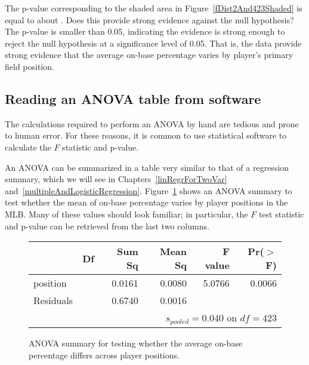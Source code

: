 \begin{examplewrap}
\begin{nexample}{The p-value corresponding to
    the shaded area in
    Figure~\ref{fDist2And423Shaded}
    is equal to about \mlbPvalue{}.
    Does this provide strong evidence against the
    null hypothesis?}
  The p-value is smaller than 0.05, indicating the evidence
  is strong enough to reject the null hypothesis
  at a significance level of 0.05.
  That is, the data provide strong evidence that the average
  on-base percentage varies by player's primary field position.
\end{nexample}
\end{examplewrap}


\subsection{Reading an ANOVA table from software}

The calculations required to perform an ANOVA by hand are
tedious and prone to human error.
For these reasons, it is common to use statistical software
to calculate the $F$ statistic and p-value.

An ANOVA can be summarized in a table very similar to that
of a regression summary, which we will see in
Chapters~\ref{linRegrForTwoVar}
and~\ref{multipleAndLogisticRegression}.
Figure~\ref{anovaSummaryTableForOBPAgainstPosition}
shows an ANOVA summary to test whether the mean of on-base
percentage varies by player positions in the MLB.
Many of these values should look familiar;
in particular, the $F$ test statistic and p-value
can be retrieved from the last two columns.

\begin{figure}[ht]
\centering
\begin{tabular}{lrrrrr}
  \hline
  & Df & Sum Sq & Mean Sq & F value & Pr($>$F) \\ 
  \hline
  position & \mlbDFA{} & 0.0161 & 0.0080 & 5.0766 & 0.0066 \\ 
  Residuals & \mlbDFB{} & 0.6740 & 0.0016 &  &  \\ 

  \hline
\multicolumn{6}{r}{$s_{pooled} = 0.040$ on $df = 423$}
\end{tabular}
\caption{ANOVA summary for testing whether the average
    on-base percentage differs across player positions.}
\label{anovaSummaryTableForOBPAgainstPosition}
\end{figure}


\D{\newpage}


